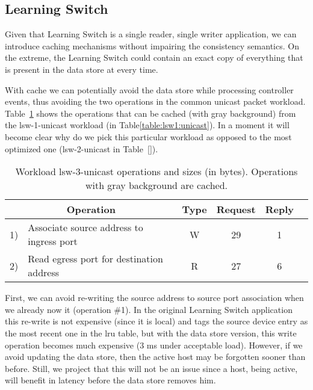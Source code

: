 \subsection{Learning Switch}
\label{sec:ls:cache}
Given that Learning Switch is a single reader, single writer application, we can introduce caching mechanisms without impairing the consistency semantics. 
On the extreme, the Learning Switch could contain an exact copy of everything that is present in the data store at every time.  

With cache we can potentially avoid the data store while processing controller events, thus avoiding the two operations in the common unicast packet workload. 
Table~\ref{table:lsw1:unicast:cache} shows the operations that can be cached (with gray background) from the lsw-1-unicast workload (in Table\ref{table:lsw1:unicast}). In a moment it will become clear why do we pick this particular workload as opposed to  the most optimized one (lsw-2-unicast in Table~\ref{}). 

\begin{table}[ht]
\small
\centering 
\begin{tabular}{l l c c c c}
\multicolumn{2}{c}{Operation} & Type & Request & Reply \\ \toprule 
\rowcolor{Gray} 1) & Associate source address to ingress port & W & 29 & 1\\
\rowcolor{Gray} 2) & Read egress port for destination address & R & 27 & 6 \\ \bottomrule
\end{tabular}
\caption[Workload unicast workload with cache]{Workload lsw-3-unicast operations and sizes (in bytes). Operations with gray background are cached. }
\label{table:lsw1:unicast:cache}
\end{table}

First, we can avoid re-writing the source address to source port association when we already now it (operation \#1). 
In the original Learning Switch application this re-write is not expensive (since it is local) and tags the source device  entry as the most recent one in the \gls{lru} table,
but with the data store version, this write operation becomes much expensive (3 ms under acceptable load).
However, if we avoid updating the data store, then the active host may be forgotten sooner than before. Still, we project that this will not be an issue since a host, being active, will benefit in latency before the data store removes him. 


